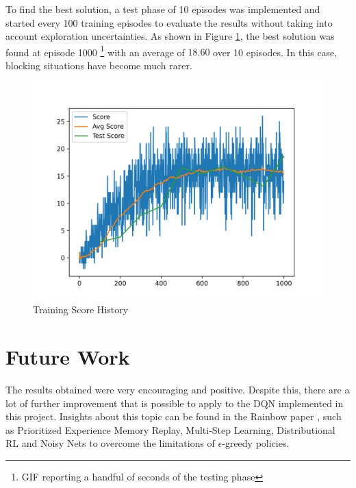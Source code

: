 \documentclass[letterpaper]{article}
\begin{document}
To find the best solution, a test phase of 10 episodes was implemented and started every 100 training episodes to evaluate the results without taking into account exploration uncertainties. As shown in Figure \ref{fig:plot}, the best solution was found at episode 1000 \footnote{GIF reporting a handful of seconds of the testing phase} with an average of $18.60$ over 10 episodes. In this case, blocking situations have become much rarer.

\begin{figure}[]
\includegraphics[width=\linewidth]{img/plot_1000.png}
\caption{Training Score History\label{fig:plot}}
\end{figure}   

\section{Future Work}

The results obtained were very encouraging and positive. Despite this, there are a lot of further improvement that is possible to apply to the DQN implemented in this project. Insights about this topic can be found in the Rainbow paper \cite{hessel2018rainbow}, such as Prioritized Experience Memory Replay, Multi-Step Learning, Distributional RL and Noisy Nets to overcome the limitations of $\epsilon$-greedy policies.




\end{document}
